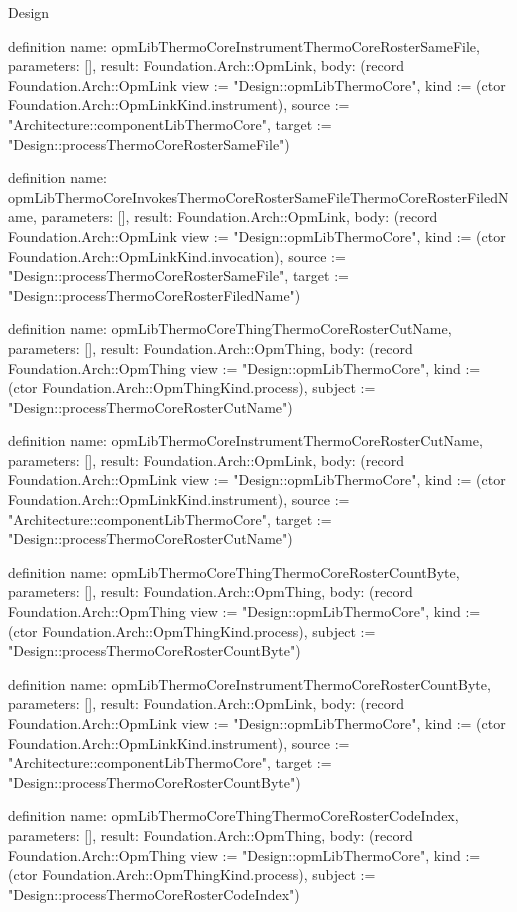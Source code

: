 \begin{lexlean}{Design}
\begin{semanticmodule}
definition{
  name: opmLibThermoCoreInstrumentThermoCoreRosterSameFile,
  parameters: [],
  result: Foundation.Arch::OpmLink,
  body: (record Foundation.Arch::OpmLink {view := "Design::opmLibThermoCore", kind := (ctor Foundation.Arch::OpmLinkKind.instrument), source := "Architecture::componentLibThermoCore", target := "Design::processThermoCoreRosterSameFile"})
}

definition{
  name: opmLibThermoCoreInvokesThermoCoreRosterSameFileThermoCoreRosterFiledName,
  parameters: [],
  result: Foundation.Arch::OpmLink,
  body: (record Foundation.Arch::OpmLink {view := "Design::opmLibThermoCore", kind := (ctor Foundation.Arch::OpmLinkKind.invocation), source := "Design::processThermoCoreRosterSameFile", target := "Design::processThermoCoreRosterFiledName"})
}

definition{
  name: opmLibThermoCoreThingThermoCoreRosterCutName,
  parameters: [],
  result: Foundation.Arch::OpmThing,
  body: (record Foundation.Arch::OpmThing {view := "Design::opmLibThermoCore", kind := (ctor Foundation.Arch::OpmThingKind.process), subject := "Design::processThermoCoreRosterCutName"})
}

definition{
  name: opmLibThermoCoreInstrumentThermoCoreRosterCutName,
  parameters: [],
  result: Foundation.Arch::OpmLink,
  body: (record Foundation.Arch::OpmLink {view := "Design::opmLibThermoCore", kind := (ctor Foundation.Arch::OpmLinkKind.instrument), source := "Architecture::componentLibThermoCore", target := "Design::processThermoCoreRosterCutName"})
}

definition{
  name: opmLibThermoCoreThingThermoCoreRosterCountByte,
  parameters: [],
  result: Foundation.Arch::OpmThing,
  body: (record Foundation.Arch::OpmThing {view := "Design::opmLibThermoCore", kind := (ctor Foundation.Arch::OpmThingKind.process), subject := "Design::processThermoCoreRosterCountByte"})
}

definition{
  name: opmLibThermoCoreInstrumentThermoCoreRosterCountByte,
  parameters: [],
  result: Foundation.Arch::OpmLink,
  body: (record Foundation.Arch::OpmLink {view := "Design::opmLibThermoCore", kind := (ctor Foundation.Arch::OpmLinkKind.instrument), source := "Architecture::componentLibThermoCore", target := "Design::processThermoCoreRosterCountByte"})
}

definition{
  name: opmLibThermoCoreThingThermoCoreRosterCodeIndex,
  parameters: [],
  result: Foundation.Arch::OpmThing,
  body: (record Foundation.Arch::OpmThing {view := "Design::opmLibThermoCore", kind := (ctor Foundation.Arch::OpmThingKind.process), subject := "Design::processThermoCoreRosterCodeIndex"})
}


\end{semanticmodule}
\end{lexlean}
